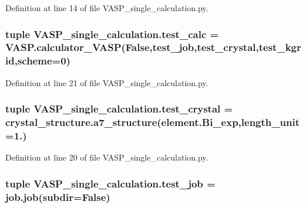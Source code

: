 Definition at line 14 of file V\+A\+S\+P\+\_\+single\+\_\+calculation.\+py.

\hypertarget{namespace_v_a_s_p__single__calculation_a07575b1567d68cb3c8e78d509898c09c}{
\subsubsection[{test\+\_\+calc}]{\setlength{\rightskip}{0pt plus 5cm}tuple V\+A\+S\+P\+\_\+single\+\_\+calculation.\+test\+\_\+calc = V\+A\+S\+P.\+calculator\+\_\+\+V\+A\+S\+P(False,{\bf test\+\_\+job},{\bf test\+\_\+crystal},{\bf test\+\_\+kgrid},scheme=0)}}\label{namespace_v_a_s_p__single__calculation_a07575b1567d68cb3c8e78d509898c09c}


Definition at line 21 of file V\+A\+S\+P\+\_\+single\+\_\+calculation.\+py.

\hypertarget{namespace_v_a_s_p__single__calculation_a95007ceef71632af1580958dce2ddf6a}{
\subsubsection[{test\+\_\+crystal}]{\setlength{\rightskip}{0pt plus 5cm}tuple V\+A\+S\+P\+\_\+single\+\_\+calculation.\+test\+\_\+crystal = crystal\+\_\+structure.\+a7\+\_\+structure(element.\+Bi\+\_\+exp,length\+\_\+unit=1.)}}\label{namespace_v_a_s_p__single__calculation_a95007ceef71632af1580958dce2ddf6a}


Definition at line 20 of file V\+A\+S\+P\+\_\+single\+\_\+calculation.\+py.

\hypertarget{namespace_v_a_s_p__single__calculation_a67b805df27d2854ee30e7d04cc24af1f}{
\subsubsection[{test\+\_\+job}]{\setlength{\rightskip}{0pt plus 5cm}tuple V\+A\+S\+P\+\_\+single\+\_\+calculation.\+test\+\_\+job = job.\+job(subdir=False)}}\label{namespace_v_a_s_p__single__calculation_a67b805df27d2854ee30e7d04cc24af1f}


